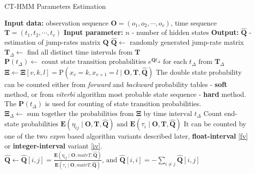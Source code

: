\documentclass[thesis=M,english]{FITthesis}[2012/10/20]
\newcommand{\matr}[1]{\mathbf{#1}}
\begin{document}
\begin{algorithm}[h]
\caption{CT-HMM Parameters Estimation}\label{pe}
\begin{algorithmic}[1]
\State \textbf{Input data:} observation sequence $\matr{O} = (o_1,o_2,\cdots,o_v)$, time sequence $\matr{T} = (t_1,t_2,\cdots,t_v)$
\State \textbf{Input parameter:} $n$ - number of hidden states
\State \textbf{Output:} $\matr{\hat{Q}}$ - estimation of jump-rates matrix $\matr{Q}$
\State $\matr{\hat{Q}} \gets$ randomly generated jump-rate matrix
\State $\matr{T}_{\Delta} \gets$ find all distinct time intervals from $\matr{T}$
\Repeat
\State $\matr{P}({t_{\Delta}}) \gets \text{ count state transition probabilities } e^{\matr{Q}t_{\Delta}} \text{ for each } t_{\Delta} \text{ from } \matr{T}_{\Delta}$
\State $\matr{\Xi} \gets \matr{\Xi}[v,k,l] = \mathrm{P}( x_v = k, x_{v+1} = l \mid \matr{O},\matr{T}, \matr{ \hat Q })$
\State \Comment The double state probability can be counted either from \textit{forward} and \textit{backward} probability tables - \textbf{soft} method, or from \textit{viterbi} algorithm most probable state sequence - \textbf{hard} method. The $\matr{P}({t_{\Delta}})$ is used for counting of state transition probabilities. 
\State $\matr{\Xi}_{\Delta} \gets \text{ sum together the probabilities from } \matr{\Xi} \text{ by time interval } t_{\Delta}  $
\State Count end-state probabilities $\mathbf{E}(\eta_{ij} \mid \matr{O}, \matr{T}, \matr{ \hat Q } ) \text{ and } \mathbf{E}(\tau_{i} \mid \matr{O}, \matr{T}, \matr{ \hat Q })$
\State \Comment It can be counted by one of the two \textit{expm} based algorithm variants described later, \textbf{float-interval} \ref{fv} or \textbf{integer-interval} variant \ref{iv}.  
\State $\matr{\hat{Q}} \gets \matr{\hat{Q}}[i,j] = \frac{\mathbf{E}(\eta_{ij} \mid \matr{O}, matr{T}, \matr{ \hat Q } )}{\mathbf{E}(\tau_{i} \mid \matr{O}, matr{T}, \matr{ \hat Q })} \text{, and } \matr{\hat{Q}}[i,i] =  - \sum_{i \neq j} \matr{\hat{Q}}[i,j]$

\EndProcedure
\end{algorithmic}
\end{algorithm}
\end{document}
